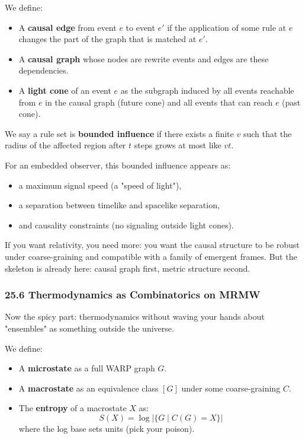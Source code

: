 We define:

\begin{itemize}
  \item A \textbf{causal edge} from event $e$ to event $e'$ if the application
        of some rule at $e$ changes the part of the graph that is matched at $e'$.

  \item A \textbf{causal graph} whose nodes are rewrite events and edges are
        these dependencies.

  \item A \textbf{light cone} of an event $e$ as the subgraph induced by
        all events reachable from $e$ in the causal graph (future cone) and
        all events that can reach $e$ (past cone).
\end{itemize}

We say a rule set is \textbf{bounded influence} if there exists a finite $v$
such that the radius of the affected region after $t$ steps grows at most like $vt$.

For an embedded observer, this bounded influence appears as:

\begin{itemize}
  \item a maximum signal speed (a "speed of light"),
  \item a separation between timelike and spacelike separation,
  \item and causality constraints (no signaling outside light cones).
\end{itemize}

If you want relativity, you need more: you want the causal structure to be
robust under coarse-graining and compatible with a family of emergent frames.
But the skeleton is already here: causal graph first, metric structure second.

\subsubsection*{25.6  Thermodynamics as Combinatorics on MRMW}

Now the spicy part: thermodynamics without waving your hands about "ensembles"
as something outside the universe.

We define:

\begin{itemize}
  \item A \textbf{microstate} as a full WARP graph $G$.
  \item A \textbf{macrostate} as an equivalence class $[G]$ under some coarse-graining $C$.
  \item The \textbf{entropy} of a macrostate $X$ as:
    \[
      S(X) = \log \left|\{ G \mid C(G) = X\} \right|
    \]
    where the log base sets units (pick your poison).
\end{itemize}

